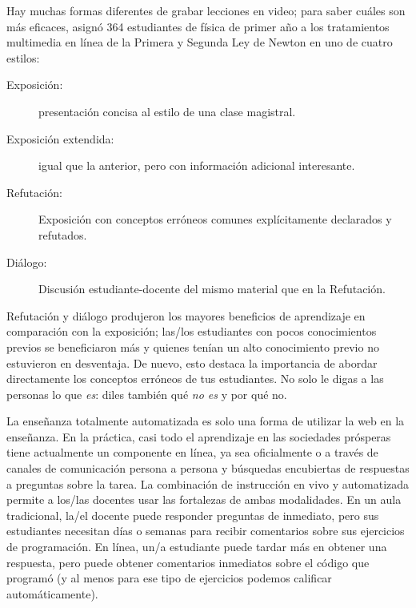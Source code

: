 Hay muchas formas diferentes de grabar lecciones en video;
para saber cuáles son más eficaces,
\cite{Mull2007a} asignó 364 estudiantes de física de primer año
a los tratamientos multimedia en línea de la Primera y Segunda Ley de Newton en uno de cuatro estilos:

\begin{description}

\item[Exposición:]
  presentación concisa al estilo de una clase magistral.

\item[Exposición extendida:]
  igual que la anterior, pero con información adicional interesante.

\item[Refutación:]
  Exposición con conceptos erróneos comunes explícitamente declarados y refutados.

\item[Diálogo:]
  Discusión estudiante-docente del mismo material que en la Refutación.

\end{description}

Refutación y diálogo produjeron los mayores beneficios de aprendizaje en comparación con la exposición;
las/los estudiantes con pocos conocimientos previos se beneficiaron más
y quienes tenían un alto conocimiento previo no estuvieron en desventaja.
De nuevo,
esto destaca la importancia de abordar directamente los conceptos erróneos de tus estudiantes.
No solo le digas a las personas lo que \emph{es}:
diles también qué \emph{no es} y por qué no.


La enseñanza totalmente automatizada es solo una forma de utilizar la web en la enseñanza.
En la práctica,
casi todo el aprendizaje en las sociedades prósperas tiene actualmente un componente en línea,
ya sea oficialmente
o a través de canales de comunicación persona a persona y búsquedas encubiertas de respuestas a preguntas sobre la tarea.
La combinación de instrucción en vivo y automatizada permite a los/las docentes usar las fortalezas de ambas modalidades.
En un aula tradicional,
la/el docente puede responder preguntas de inmediato,
pero sus estudiantes necesitan días o semanas para recibir comentarios sobre sus ejercicios de programación.
En línea,
un/a estudiante puede tardar más en obtener una respuesta,
pero puede obtener comentarios inmediatos sobre el código que programó
(y al menos para ese tipo de ejercicios podemos calificar automáticamente).

